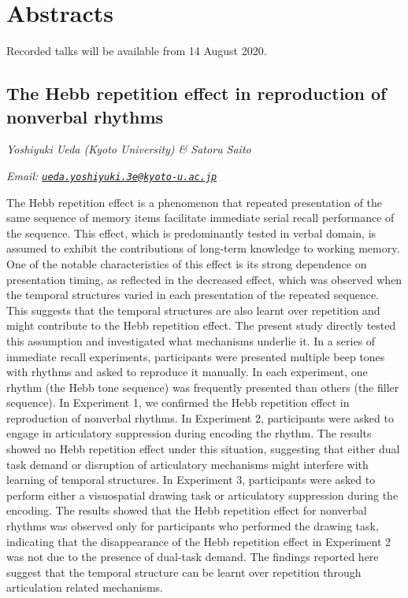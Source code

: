 \documentclass[12pt,]{book}
\begin{document}
\hypertarget{abstracts}{%
\section{Abstracts}\label{abstracts}}

Recorded talks will be available from 14 August 2020.

\hypertarget{the-hebb-repetition-effect-in-reproduction-of-nonverbal-rhythms}{%
\subsection{The Hebb repetition effect in reproduction of nonverbal rhythms}\label{the-hebb-repetition-effect-in-reproduction-of-nonverbal-rhythms}}

\emph{Yoshiyuki Ueda (Kyoto University) \& Satoru Saito}

\emph{Email: \href{mailto:ueda.yoshiyuki.3e@kyoto-u.ac.jp}{\nolinkurl{ueda.yoshiyuki.3e@kyoto-u.ac.jp}}}

The Hebb repetition effect is a phenomenon that repeated presentation of the same sequence of memory items facilitate immediate serial recall performance of the sequence. This effect, which is predominantly tested in verbal domain, is assumed to exhibit the contributions of long-term knowledge to working memory. One of the notable characteristics of this effect is its strong dependence on presentation timing, as reflected in the decreased effect, which was observed when the temporal structures varied in each presentation of the repeated sequence. This suggests that the temporal structures are also learnt over repetition and might contribute to the Hebb repetition effect. The present study directly tested this assumption and investigated what mechanisms underlie it. In a series of immediate recall experiments, participants were presented multiple beep tones with rhythms and asked to reproduce it manually. In each experiment, one rhythm (the Hebb tone sequence) was frequently presented than others (the filler sequence). In Experiment 1, we confirmed the Hebb repetition effect in reproduction of nonverbal rhythms. In Experiment 2, participants were asked to engage in articulatory suppression during encoding the rhythm. The results showed no Hebb repetition effect under this situation, suggesting that either dual task demand or disruption of articulatory mechanisms might interfere with learning of temporal structures. In Experiment 3, participants were asked to perform either a visuospatial drawing task or articulatory suppression during the encoding. The results showed that the Hebb repetition effect for nonverbal rhythms was observed only for participants who performed the drawing task, indicating that the disappearance of the Hebb repetition effect in Experiment 2 was not due to the presence of dual-task demand. The findings reported here suggest that the temporal structure can be learnt over repetition through articulation related mechanisms.
\end{document}
